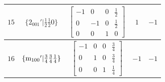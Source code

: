 \documentclass[fleqn,8pt]{jsarticle}
\begin{document}
\begin{longtable}{ccccc}
$ 15 $ & $ \{2{}_{001}{}'|\frac{1}{2} \frac{1}{2} 0\} $ & $ \begin{bmatrix} -1 & 0 & 0 & \frac{1}{2} \\ 0 & -1 & 0 & \frac{1}{2} \\ 0 & 0 & 1 & 0 \end{bmatrix} $ & $ 1 $ & $ -1 $ \\ \hline
$ 16 $ & $ \{{\rm m}_{100}{}'|\frac{3}{4} \frac{3}{4} \frac{1}{4}\} $ & $ \begin{bmatrix} -1 & 0 & 0 & \frac{3}{4} \\ 0 & 1 & 0 & \frac{3}{4} \\ 0 & 0 & 1 & \frac{1}{4} \end{bmatrix} $ & $ -1 $ & $ -1 $ \\
\end{longtable}
\end{document}
